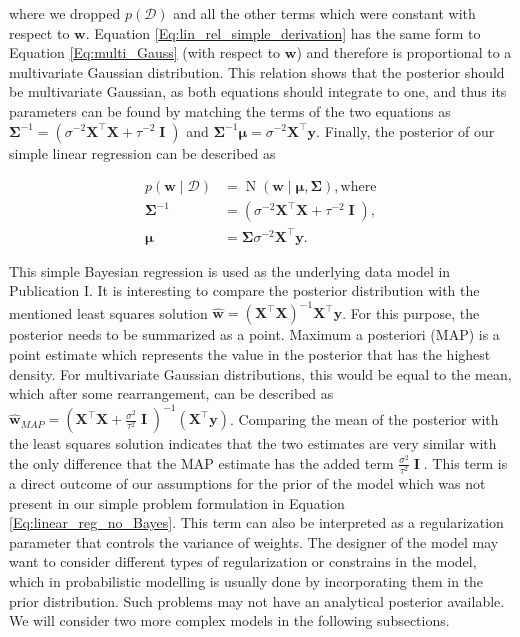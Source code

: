 \documentclass[dissertation,math,vertlayout,pdfa,colorlinks]{aaltoseries}
\newcommand{\bw}{\bm{w}}
\newcommand{\bX}{\bm{X}}
\newcommand{\by}{\bm{y}}
\newcommand{\bD}{\mathcal{D}}
\DeclareMathOperator{\eye}{\textbf{I}}
\DeclareMathOperator{\normalpdf}{N}
\newcommand{\tp}{^{\top}}
\begin{document}
\noindent where we dropped $p(\bD)$ and all the other terms which were constant with respect to $\bw$. Equation \ref{Eq:lin_rel_simple_derivation} has the same form to Equation \ref{Eq:multi_Gauss} (with respect to $\bw$) and therefore is proportional to a multivariate Gaussian distribution. This relation shows that the posterior should be multivariate Gaussian, as both equations should integrate to one, and thus its parameters can be found by matching the terms of the two equations as $\bm{\Sigma}^{-1} = ( \sigma^{-2}\bX\tp\bX + \tau^{-2} \eye ) $ and $\bm{\Sigma}^{-1}\bm{\mu} = \sigma^{-2}\bX\tp\by$. Finally, the posterior of our simple linear regression can be described as 

\begin{align}\label{Eq:lin_rel_simple_posterior}
	p(\bw \mid \bD) &= \normalpdf(\bw \mid \bm{\mu},\bm{\Sigma}), \text{where}\\
	\bm{\Sigma}^{-1} &= (\sigma^{-2}\bX\tp\bX + \tau^{-2} \eye ), \nonumber\\
	\bm{\mu} &= \bm{\Sigma}\sigma^{-2}\bX\tp\by. \nonumber
\end{align}

This simple Bayesian regression is used as the underlying data model in Publication I. It is interesting to compare the posterior distribution with the mentioned least squares solution $\hat{\bw} = (\bX \tp \bX)^{-1}\bX\tp \by$. For this purpose, the posterior needs to be summarized as a point. Maximum a posteriori (MAP) is a point estimate which represents the value in the posterior that has the highest density. For multivariate Gaussian distributions, this would be equal to the mean, which after some rearrangement, can be described as $\hat{\bw}_{MAP} = (\bX\tp\bX + \frac{\sigma^{2}}{\tau^{2}} \eye )^{-1}(\bX\tp\by)$. Comparing the mean of the posterior with the least squares solution indicates that the two estimates are very similar with the only difference that the MAP estimate has the added term $\frac{\sigma^{2}}{\tau^{2}} \eye$. This term is a direct outcome of our assumptions for the prior of the model which was not present in our simple problem formulation in Equation \ref{Eq:linear_reg_no_Bayes}. This term can also be interpreted as a regularization parameter that controls the variance of weights. The designer of the model may want to consider different types of regularization or constrains in the model, which in probabilistic modelling is usually done by incorporating them in the prior distribution. Such problems may not have an analytical posterior available. We will consider two more complex models in the following subsections.
\end{document}
